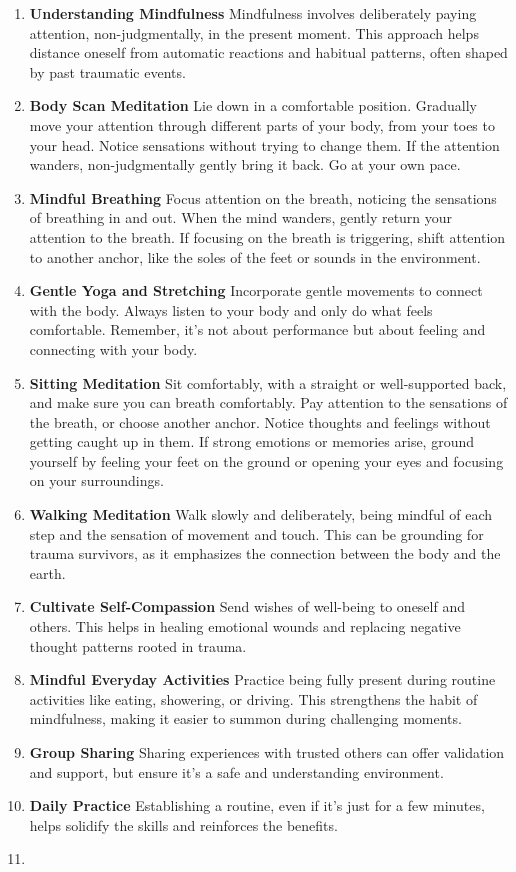 \documentclass[12pt,letterpaper]{article}
\begin{document}
\begin{enumerate}
    \item \textbf{Understanding Mindfulness} Mindfulness involves deliberately paying attention, non-judgmentally, in the present moment. This approach helps distance oneself from automatic reactions and habitual patterns, often shaped by past traumatic events. 
    \item \textbf{Body Scan Meditation} Lie down in a comfortable position. Gradually move your attention through different parts of your body, from your toes to your head. Notice sensations without trying to change them. If the attention wanders, non-judgmentally gently bring it back. Go at your own pace.
    \item \textbf{Mindful Breathing} Focus attention on the breath, noticing the sensations of breathing in and out. When the mind wanders, gently return your attention to the breath. If focusing on the breath is triggering, shift attention to another anchor, like the soles of the feet or sounds in the environment.
    \item \textbf{Gentle Yoga and Stretching} Incorporate gentle movements to connect with the body. Always listen to your body and only do what feels comfortable. Remember, it's not about performance but about feeling and connecting with your body.
    \item \textbf{Sitting Meditation} Sit comfortably, with a straight or well-supported back, and make sure you can breath comfortably. Pay attention to the sensations of the breath, or choose another anchor. Notice thoughts and feelings without getting caught up in them. If strong emotions or memories arise, ground yourself by feeling your feet on the ground or opening your eyes and focusing on your surroundings.
    \item \textbf{Walking Meditation} Walk slowly and deliberately, being mindful of each step and the sensation of movement and touch. This can be grounding for trauma survivors, as it emphasizes the connection between the body and the earth.
    \item \textbf{Cultivate Self-Compassion} Send wishes of well-being to oneself and others. This helps in healing emotional wounds and replacing negative thought patterns rooted in trauma. 
    \item \textbf{Mindful Everyday Activities} Practice being fully present during routine activities like eating, showering, or driving. This strengthens the habit of mindfulness, making it easier to summon during challenging moments.
    \item \textbf{Group Sharing} Sharing experiences with trusted others can offer validation and support, but ensure it's a safe and understanding environment.
    \item \textbf{Daily Practice} Establishing a routine, even if it's just for a few minutes, helps solidify the skills and reinforces the benefits.
    \item {}
\end{enumerate}
\end{document}
